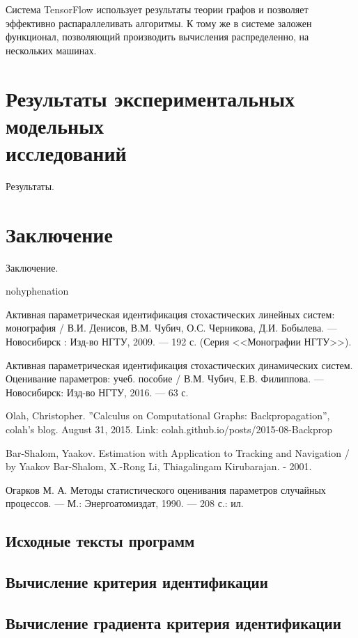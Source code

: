 \documentclass[a4paper,14pt]{extarticle}
\begin{document}
Система TensorFlow использует результаты теории графов и позволяет эффективно 
распараллеливать алгоритмы. К тому же в системе заложен функционал, позволяющий
производить вычисления распределенно, на нескольких машинах.

\section[Результаты экспериментальных модельных исследований]
{Результаты экспериментальных модельных \\исследований} 

Результаты.

\section*{Заключение}

Заключение.

\begin{thebibliography}{9}

\begin{hyphenrules}{nohyphenation} 

\begin{sloppypar}

 Активная параметрическая идентификация стохастических
линейных систем: монография / В.И. Денисов, В.М. Чубич, О.С. Черникова, Д.И.
Бобылева. --- Новосибирск : Изд-во НГТУ, 2009. --- 192 с. (Серия <<Монографии
НГТУ>>).

 Активная параметрическая идентификация стохастических
динамических систем. Оценивание параметров: учеб. пособие / В.М. Чубич, Е.В.
Филиппова. --- Новосибирск: Изд-во НГТУ, 2016. --- 63 с.

 Olah, Christopher. ''Calculus on Computational Graphs:
Backpropagation'', colah's blog. August 31, 2015.
Link: colah.github.io/posts/2015-08-Backprop

 Bar-Shalom, Yaakov. Estimation with Application to Tracking
and Navigation / by Yaakov Bar-Shalom, X.-Rong Li, Thiagalingam Kirubarajan. 
	- 2001.

 Огарков М. А. Методы статистического оценивания параметров
случайных процессов. --- М.: Энергоатомиздат, 1990. --- 208 с.: ил.

\end{sloppypar}

\end{hyphenrules}

\end{thebibliography}

\begin{appendices}

\section{Исходные тексты программ}

\subsection{Вычисление критерия идентификации}

\subsection{Вычисление градиента критерия идентификации}

\end{appendices}
\end{document}
